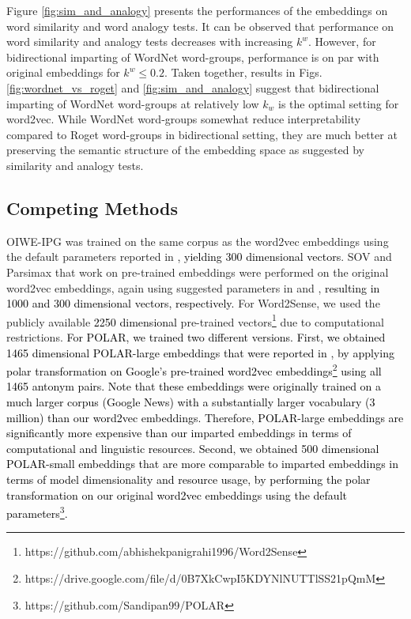 \documentclass[11pt,a4paper]{article}
\begin{document}
Figure \ref{fig:sim_and_analogy} presents the performances of the embeddings on word similarity and word analogy tests. It can be observed that performance on word similarity and analogy tests decreases with increasing $k^w$.  However, for bidirectional imparting of WordNet word-groups, performance is on par with original embeddings for $k^w \leq 0.2$. Taken together, results in Figs. \ref{fig:wordnet_vs_roget} and \ref{fig:sim_and_analogy} suggest that bidirectional imparting of WordNet word-groups at relatively low $k_w$ is the optimal setting for word2vec. While WordNet word-groups somewhat reduce interpretability compared to Roget word-groups in bidirectional setting, they are much better at preserving the semantic structure of the embedding space as suggested by similarity and analogy tests.
 
 
 
 
 
 
 
 
 \subsection{Competing Methods}
 \label{app:competing_methods}
 
 OIWE-IPG was trained on the same corpus as the word2vec embeddings using the default parameters reported in \citep{luo15online} \textcolor{black}{, yielding 300 dimensional vectors}. SOV and Parsimax that work on pre-trained embeddings were performed on the original word2vec embeddings, again using suggested parameters in \citep{faruqui15sparse} and \citep{park17rotated}, \textcolor{black}{resulting in 1000 and 300 dimensional vectors, respectively.} For Word2Sense, we used the publicly available \textcolor{black}{2250 dimensional} pre-trained vectors\footnote{https://github.com/abhishekpanigrahi1996/Word2Sense} due to computational restrictions. \textcolor{black}{For POLAR, we trained two different versions. First, we obtained 1465 dimensional POLAR-large embeddings that were reported in \citep{mathew20polar}, by applying polar transformation on Google's pre-trained word2vec embeddings\footnote{https://drive.google.com/file/d/0B7XkCwpI5KDYNlNUTTlSS21pQmM} using all 1465 antonym pairs. Note that these embeddings were originally trained on a much larger corpus (Google News) with a substantially larger vocabulary (3 million) than our word2vec embeddings. Therefore, POLAR-large embeddings are significantly more expensive than our imparted embeddings in terms of computational and linguistic resources. Second, we obtained 500 dimensional POLAR-small embeddings that are more comparable to imparted embeddings in terms of model dimensionality and resource usage, by performing the polar transformation on our original word2vec embeddings using the default parameters\footnote{https://github.com/Sandipan99/POLAR}.} 
 
\end{document}
